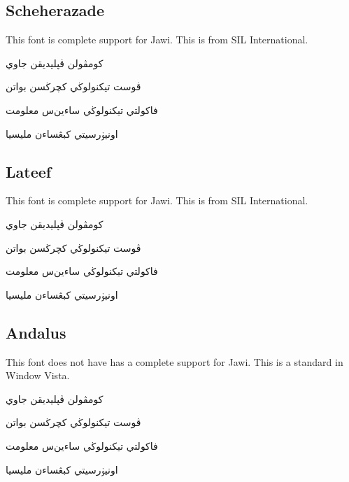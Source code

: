 \documentclass[12pt,a4paper]{IEEEconf}
\begin{document}
\subsection{Scheherazade}
This font is complete support for Jawi. This is from SIL International.
\newfontfamily{}

\begin{arab}
\begin{center}
کومڤولن ڤڽليديقن جاوي
\par  
ڤوست تيكنولوڬي کچرڬسن بواتن
\par  
فاکولتي تيكنولوڬي ساءين‌س معلومت
\par  
اونيۏرسيتي کبڠساءن مليسيا
\par  
\end{center}
\end{arab}

\subsection{Lateef}
This font is complete support for Jawi. This is from SIL International.
\newfontfamily{}

\begin{arab}
\begin{center}
کومڤولن ڤڽليديقن جاوي
\par  
ڤوست تيكنولوڬي کچرڬسن بواتن
\par  
فاکولتي تيكنولوڬي ساءين‌س معلومت
\par  
اونيۏرسيتي کبڠساءن مليسيا
\par  
\end{center}
\end{arab}

\subsection{Andalus}
This font does not have has a complete support for Jawi. This is a standard in Window Vista.
\newfontfamily{}

\begin{arab}
\begin{center}
کومڤولن ڤڽليديقن جاوي
\par  
ڤوست تيكنولوڬي کچرڬسن بواتن
\par  
فاکولتي تيكنولوڬي ساءين‌س معلومت
\par  
اونيۏرسيتي کبڠساءن مليسيا
\par  
\end{center}
\end{arab}
\end{document}
